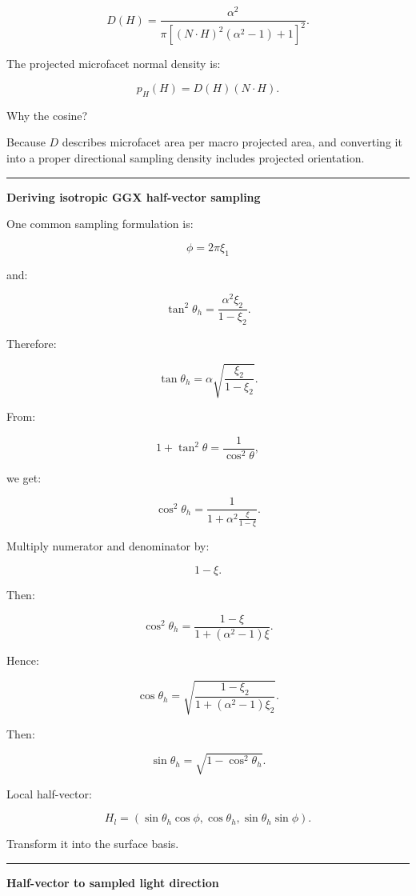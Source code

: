 \[
D(H)
=
\frac{
\alpha^2
}{
\pi
[
(N\cdot H)^2(\alpha^2-1)+1
]^2
}.
\]

The projected microfacet normal density is:

\[
\boxed{
p_H(H)
=
D(H)(N\cdot H).
}
\]

Why the cosine?

Because \(D\) describes microfacet area per macro projected area, and converting it into a proper directional sampling density includes projected orientation.

\begin{center}\rule{0.5\linewidth}{0.5pt}\end{center}

\textbf{Deriving isotropic GGX half-vector sampling}

One common sampling formulation is:

\[
\phi=2\pi\xi_1
\]

and:

\[
\tan^2\theta_h
=
\frac{
\alpha^2\xi_2
}{
1-\xi_2
}.
\]

Therefore:

\[
\tan\theta_h
=
\alpha
\sqrt{
\frac{\xi_2}{1-\xi_2}
}.
\]

From:

\[
1+\tan^2\theta
=
\frac1{\cos^2\theta},
\]

we get:

\[
\cos^2\theta_h
=
\frac1{
1+
\alpha^2
\frac{\xi}{1-\xi}
}.
\]

Multiply numerator and denominator by:

\[
1-\xi.
\]

Then:

\[
\boxed{
\cos^2\theta_h
=
\frac{
1-\xi
}{
1+(\alpha^2-1)\xi
}.
}
\]

Hence:

\[
\boxed{
\cos\theta_h
=
\sqrt{
\frac{
1-\xi_2
}{
1+(\alpha^2-1)\xi_2
}
}.
}
\]

Then:

\[
\sin\theta_h
=
\sqrt{
1-\cos^2\theta_h
}.
\]

Local half-vector:

\[
H_l=
(
\sin\theta_h\cos\phi,
\cos\theta_h,
\sin\theta_h\sin\phi
).
\]

Transform it into the surface basis.

\begin{center}\rule{0.5\linewidth}{0.5pt}\end{center}

\textbf{Half-vector to sampled light direction}

